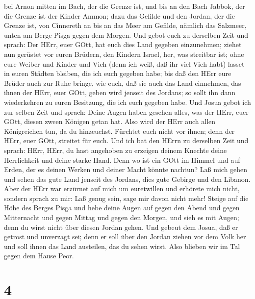 bei Arnon mitten im Bach, der die Grenze ist, und bis an den Bach
Jabbok, der die Grenze ist der Kinder Ammon;  dazu das
Gefilde und den Jordan, der die Grenze ist, von Cinnereth an bis an das
Meer am Gefilde, nämlich das Salzmeer, unten am Berge Pisga gegen dem
Morgen.  Und gebot euch zu derselben Zeit und sprach: Der
HErr, euer GOtt, hat euch dies Land gegeben einzunehmen; ziehet nun
gerüstet vor euren Brüdern, den Kindern Israel, her, was streitbar ist;
 ohne eure Weiber und Kinder und Vieh (denn ich weiß, daß
ihr viel Vieh habt) lasset in euren Städten bleiben, die ich euch
gegeben habe;  bis daß den HErr eure Brüder auch zur Ruhe
bringe, wie euch, daß sie auch das Land einnehmen, das ihnen der HErr,
euer GOtt, geben wird jenseit des Jordans; so sollt ihn dann
wiederkehren zu euren Besitzung, die ich euch gegeben habe.
 Und Josua gebot ich zur selben Zeit und sprach: Deine
Augen haben gesehen alles, was der HErr, euer GOtt, diesen zween Königen
getan hat. Also wird der HErr auch allen Königreichen tun, da du
hinzeuchst.  Fürchtet euch nicht vor ihnen; denn der HErr,
euer GOtt, streitet für euch.  Und ich bat den HErrn zu
derselben Zeit und sprach:  HErr, HErr, du hast angehoben
zu erzeigen deinem Knechte deine Herrlichkeit und deine starke Hand.
Denn wo ist ein GOtt im Himmel und auf Erden, der es deinen Werken und
deiner Macht könnte nachtun?  Laß mich gehen und sehen das
gute Land jenseit des Jordans, dies gute Gebirge und den Libanon.
 Aber der HErr war erzürnet auf mich um euretwillen und
erhörete mich nicht, sondern sprach zu mir: Laß genug sein, sage mir
davon nicht mehr!  Steige auf die Höhe des Berges Pisga und
hebe deine Augen auf gegen den Abend und gegen Mitternacht und gegen
Mittag und gegen den Morgen, und sieh es mit Augen; denn du wirst nicht
über diesen Jordan gehen.  Und gebeut dem Josua, daß er
getrost und unverzagt sei; denn er soll über den Jordan ziehen vor dem
Volk her und soll ihnen das Land austeilen, das du sehen wirst.
 Also blieben wir im Tal gegen dem Hause Peor.

\hypertarget{section-3}{%
\section{4}\label{section-3}}


